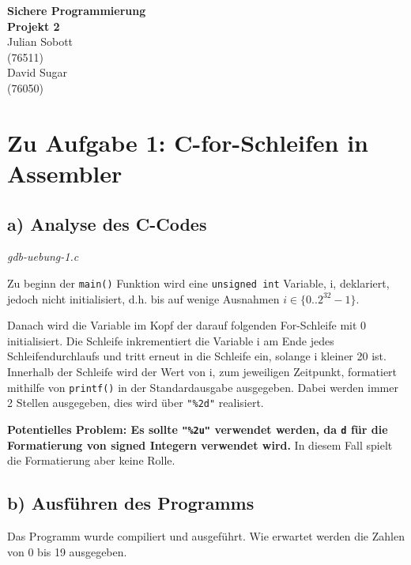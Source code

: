 \documentclass[12pt]{article}
\begin{document}
\begin{center}
  \textbf{\LARGE Sichere Programmierung} \\[1ex]%
  \textbf{\Large Projekt 2}\\[2ex] %
  Julian Sobott \\ %
  (76511) \\ %
  David Sugar \\ %
  (76050) \\ %
  
\end{center}

\newpage
\tableofcontents
\newpage

\section{Zu Aufgabe 1: C-for-Schleifen in Assembler}
\subsection{a) Analyse des C-Codes}

\textit{gdb-uebung-1.c}



Zu beginn der \texttt{main()} Funktion wird eine \texttt{unsigned int} Variable, i, deklariert, jedoch nicht initialisiert, d.h. bis auf wenige Ausnahmen $i \in \{0..2^{32}-1\}$.

Danach wird die Variable im Kopf der darauf folgenden For-Schleife mit 0 initialisiert. Die Schleife inkrementiert die Variable i am Ende jedes Schleifendurchlaufs und tritt erneut in die Schleife ein, solange i kleiner 20 ist.
Innerhalb der Schleife wird der Wert von i, zum jeweiligen Zeitpunkt, formatiert mithilfe von \texttt{printf()} in der Standardausgabe ausgegeben. Dabei werden immer 2 Stellen ausgegeben, dies wird über \texttt{"\%2d"} realisiert.

\textbf{Potentielles Problem: Es sollte \texttt{"\%2u"} verwendet werden, da \texttt{d} für die Formatierung von signed Integern verwendet wird.} In diesem Fall spielt die Formatierung aber keine Rolle.

\subsection{b) Ausführen des Programms}
Das Programm wurde compiliert und ausgeführt. Wie erwartet werden die Zahlen von 0 bis 19 ausgegeben.
\end{document}
